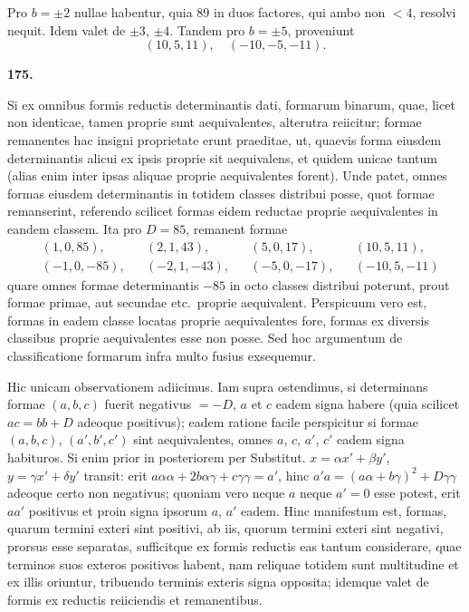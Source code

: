 \documentclass[12pt,a4paper]{article}
\theoremstyle{plain}
\begin{document}
Pro $b = \pm 2$ nullae habentur, quia $89$ in duos factores, qui ambo non $< 4$, resolvi nequit. Idem valet de $\pm 3$, $\pm 4$. Tandem pro $b = \pm 5$, proveniunt
\[
(10,5,11), \quad (-10,-5,-11).
\]

\bigskip

\textbf{175.}

Si ex omnibus formis reductis determinantis dati, formarum binarum, quae, licet non identicae, tamen proprie sunt aequivalentes, alterutra reiicitur; formae remanentes hac insigni proprietate erunt praeditae, ut, quaevis forma eiusdem determinantis alicui ex ipsis proprie sit aequivalens, et quidem unicae tantum (alias enim inter ipsas aliquae proprie aequivalentes forent). Unde patet, omnes formas eiusdem determinantis in totidem classes distribui posse, quot formae remanserint, referendo scilicet formas eidem reductae proprie aequivalentes in eandem classem. Ita pro $D = 85$, remanent formae
\[
\begin{aligned}
&(1,0,85), &&(2,1,43), &&(5,0,17), &&(10,5,11),\\
&(-1,0,-85), &&(-2,1,-43), &&(-5,0,-17), &&(-10,5,-11)
\end{aligned}
\]
quare omnes formae determinantis $-85$ in octo classes distribui poterunt, prout formae primae, aut secundae etc.~proprie aequivalent. Perspicuum vero est, formas in eadem classe locatas proprie aequivalentes fore, formas ex diversis classibus proprie aequivalentes esse non posse. Sed hoc argumentum de classificatione formarum infra multo fusius exsequemur.

Hic unicam observationem adiicimus. Iam supra ostendimus, si determinans formae $(a,b,c)$ fuerit negativus $= -D$, $a$ et $c$ eadem signa habere (quia scilicet $ac = bb + D$ adeoque positivus); eadem ratione facile perspicitur si formae $(a,b,c)$, $(a',b',c')$ sint aequivalentes, omnes $a$, $c$, $a'$, $c'$ eadem signa habituros. Si enim prior in posteriorem per Substitut. $x = \alpha x' + \beta y'$, $y = \gamma x' + \delta y'$ transit: erit $a\alpha\alpha + 2b\alpha\gamma + c\gamma\gamma = a'$, hinc $a'a = (a\alpha + b\gamma)^2 + D\gamma\gamma$ adeoque certo non negativus; quoniam vero neque $a$ neque $a' = 0$ esse potest, erit $aa'$ positivus et proin signa ipsorum $a$, $a'$ eadem. Hinc manifestum est, formas, quarum termini exteri sint positivi, ab iis, quorum termini exteri sint negativi, prorsus esse separatas, sufficitque ex formis reductis eas tantum considerare, quae terminos suos exteros positivos habent, nam reliquae totidem sunt multitudine et ex illis oriuntur, tribuendo terminis exteris signa opposita; idemque valet de formis ex reductis reiiciendis et remanentibus.
\end{document}
